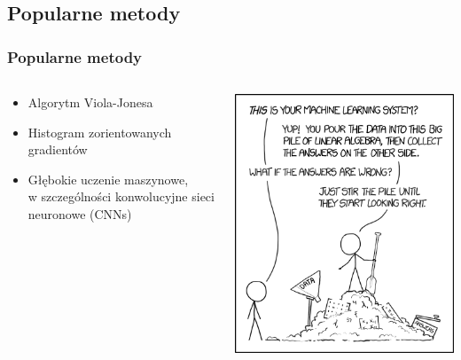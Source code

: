 \documentclass{beamer}
\begin{document}
        \subsection{Popularne metody}
            \begin{frame}
                \frametitle{Popularne metody}
                \begin{columns}
                    \begin{column}{0.5\textwidth}
                        \begin{itemize}
                            \item Algorytm Viola-Jonesa
                            \item Histogram zorientowanych gradientów
                            \item Głębokie uczenie maszynowe,\\ w szczególności konwolucyjne sieci neuronowe (CNNs)
                        \end{itemize}
                    \end{column}
                    \begin{column}{0.5\textwidth}
                        \includegraphics[width=1\textwidth]{pictures/machine_learning.png}
                    \end{column}
                \end{columns}
            \end{frame}
\end{document}
